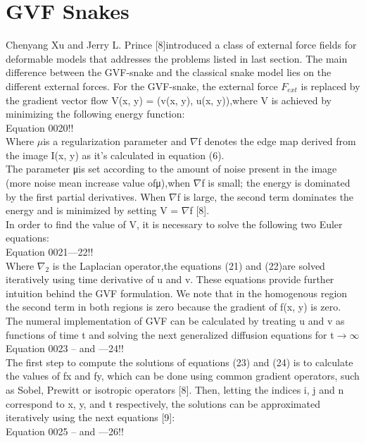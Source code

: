 \section{GVF Snakes}\label{sec:gvf-snakes}
Chenyang Xu and Jerry L. Prince [8]introduced a class of external force fields for
deformable models that addresses the problems listed in last section.
The main difference between the GVF-snake and the classical snake model lies
on the different external forces. For the GVF-snake, the external force $F_{ext}$ is
replaced by the gradient vector flow V(x, y) = (v(x, y), u(x, y)),where V is
achieved by minimizing the following energy function:\\
Equation 0020!!\\
Where $\mu$is a regularization parameter and $\nabla$f denotes the edge map
derived from the image I(x, y) as it’s calculated in equation (6).\\
The parameter μis set according to the amount of noise present in the image
(more noise mean increase value ofμ),when $\nabla$f is small; the energy is
dominated by the first partial derivatives. When $\nabla$f is large, the second term
dominates the energy and is minimized by setting V = $\nabla$f [8].\\
In order to find the value of V, it is necessary to solve the following two Euler
equations:
\\
Equation 0021---22!!\\
Where $\nabla_2$ is the Laplacian operator,the equations (21) and (22)are solved
iteratively using time derivative of u and v. These equations provide further
intuition behind the GVF formulation. We note that in the homogenous region the second term
in both regions is zero because the gradient of f(x, y) is zero.
The numeral implementation of GVF can be calculated by treating u and v as
functions of time t and solving the next generalized diffusion equations for t$\rightarrow \infty$
\\Equation 0023       --         and                  ---24!!\\
The first step to compute the solutions of equations (23) and (24) is to calculate
the values of fx and fy, which can be done using common gradient operators,
such as Sobel, Prewitt or isotropic operators [8]. Then, letting the indices i, j
and n correspond to x, y, and t respectively, the solutions can be approximated
iteratively using the next equations [9]:
\\Equation 0025       --         and                  ---26!!\\
